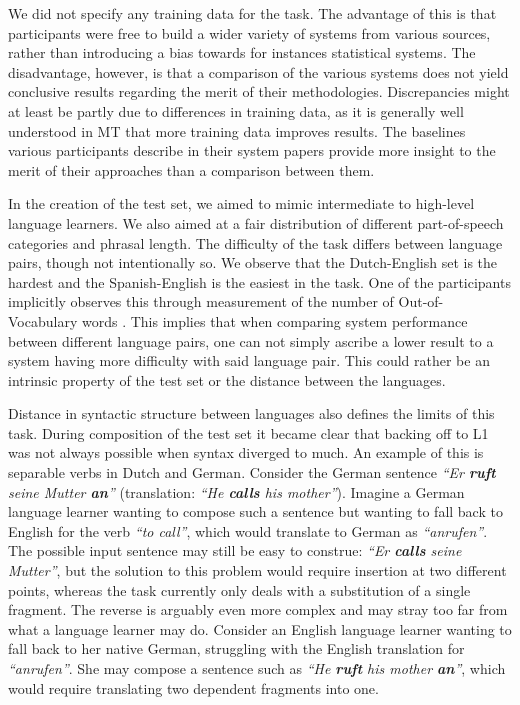 We did not specify any training data for the task. The advantage of this is
that participants were free to build a wider variety of systems from various
sources, rather than introducing a bias towards for instances statistical
systems. The disadvantage, however, is that a comparison of the various systems
does not yield conclusive results regarding the merit of their methodologies.
Discrepancies might at least be partly due to differences in training data, as
it is generally well understood in MT that more training data improves results.
The baselines various participants describe in their system papers provide more
insight to the merit of their approaches than a comparison between them.
 
In the creation of the test set, we aimed to mimic intermediate to high-level
language learners. We also aimed at a fair distribution of different
part-of-speech categories and phrasal length. The difficulty of the task
differs between language pairs, though not intentionally so. We observe that
the Dutch-English set is the hardest and the Spanish-English is the easiest in
the task. One of the participants implicitly observes this through measurement
of the number of Out-of-Vocabulary words \citep{CNRC}. This implies that when
comparing system performance between different language pairs, one can not
simply ascribe a lower result to a system having more difficulty with said
language pair. This could rather be an intrinsic property of the test set or
the distance between the languages.

Distance in syntactic structure between languages also defines the limits of
this task. During composition of the test set it became clear that backing off
to L1 was not always possible when syntax diverged to much. An example of this
is separable verbs in Dutch and German. Consider the German sentence \emph{``Er
\textbf{ruft} seine Mutter \textbf{an}''} (translation: \emph{``He
\textbf{calls} his mother''}). Imagine a German language learner wanting to
compose such a sentence but wanting to fall back to English for the verb
\emph{``to call''}, which would translate to German as \emph{``anrufen''}. The
possible input sentence may still be easy to construe: \emph{``Er
\textbf{calls} seine Mutter''}, but the solution to this problem would require
insertion at two different points, whereas the task currently only deals with a
substitution of a single fragment. The reverse is arguably even more complex
and may stray too far from what a language learner may do. Consider an English
language learner wanting to fall back to her native German, struggling with the
English translation for \emph{``anrufen''}. She may compose a sentence such as
\emph{``He \textbf{ruft} his mother \textbf{an}''}, which would require
translating two dependent fragments into one.

